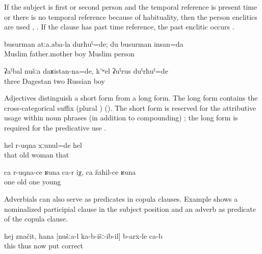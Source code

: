 If the subject is first or second person and the temporal reference is present time or there is no temporal reference because of habituality, then the person enclitics are used , . If the clause has past time reference, the past enclitic occurs .
%
\begin{exe}
	\ex	\label{ex:‎I was the son of Muslim parents; I am a Muslim}
	\gll	busurman	atːa.aba-la	durħuˁ=de; du	busurman	insan=da\\
		Muslim father.mother	boy		Muslim	person		\\
	\glt	{}

	\ex	\label{ex:‎We three were from Daghestan, and there were two Russian guys}
	\gll	ʡaˁbal	nušːa	daʁistan-na=de,	k'ʷel	ʡuˁrus	duˁrħuˁ=de\\
		three		Dagestan	two	Russian	boy\\
	\glt	{}
\end{exe}


Adjectives distinguish a short form from a long form. The long form contains the cross-categorical suffix  (plural ) (). The short form is reserved for the attributive usage within noun phrases (in addition to compounding) ; the long form is required for the predicative use . 
%
\begin{exe}
	\ex	\label{ex:‎‎‎She was an old woman}
	\gll	hel	r-uqna	xːunul=de	hel\\
		that	old	woman	that\\
	\glt	{}

	\ex	\label{ex:One is like old, one like young}
	\gll	ca	r-uqna-ce	ʁuna	ca-r	iχ,	ca	žahil-ce	ʁuna\\
		one	old				one	young		\\
	\glt	{}
\end{exe}

Adverbials can also serve as predicates in copula clauses. Example  shows a nominalized participial clause in the subject position and an adverb as predicate of the copula clause.
%
\begin{exe}
	\ex	\label{ex:‎This means, how we put (the pictures) down is correct}
	\gll	hej	značit,	hana	[nušːa-l	ka-b-išː-ib-il]	b-arx-le	ca-b\\
		this	thus	now		put	correct	\\
	\glt	{}
\end{exe}

